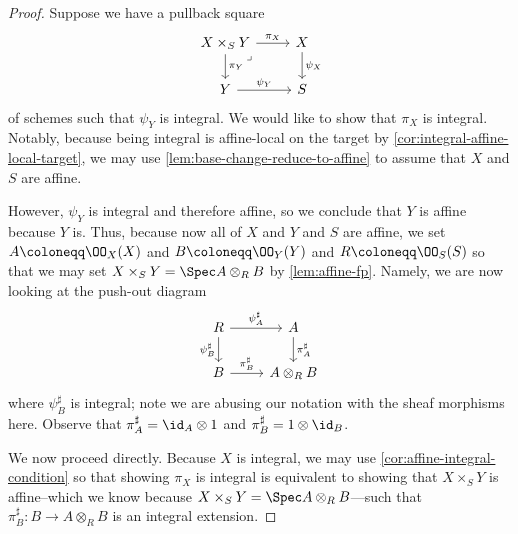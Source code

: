 \documentclass[../notes.tex]{subfiles}
\begin{document}
\begin{proof}
	Suppose we have a pullback square
	\[\begin{tikzcd}
		{X\times_SY} & X \\
		Y & S
		\arrow["{\psi_Y}", from=2-1, to=2-2]
		\arrow["{\pi_X}", from=1-1, to=1-2]
		\arrow["{\pi_Y}", from=1-1, to=2-1]
		\arrow["{\psi_X}", from=1-2, to=2-2]
		\arrow["\lrcorner"{anchor=center, pos=0.125}, draw=none, from=1-1, to=2-2]
	\end{tikzcd}\]
	of schemes such that $\psi_Y$ is integral. We would like to show that $\pi_X$ is integral. Notably, because being integral is affine-local on the target by \autoref{cor:integral-affine-local-target}, we may use \autoref{lem:base-change-reduce-to-affine} to assume that $X$ and $S$ are affine.

	However, $\psi_Y$ is integral and therefore affine, so we conclude that $Y$ is affine because $Y$ is. Thus, because now all of $X$ and $Y$ and $S$ are affine, we set $A\coloneqq\OO_X(X)$ and $B\coloneqq\OO_Y(Y)$ and $R\coloneqq\OO_S(S)$ so that we may set $X\times_SY=\Spec A\otimes_RB$ by \autoref{lem:affine-fp}. Namely, we are now looking at the push-out diagram
	\[\begin{tikzcd}
		R & A \\
		B & {A\otimes_RB}
		\arrow["{\psi^\sharp_A}", from=1-1, to=1-2]
		\arrow["{\pi^\sharp_A}", from=1-2, to=2-2]
		\arrow["{\psi^\sharp_B}"', from=1-1, to=2-1]
		\arrow["{\pi^\sharp_B}", from=2-1, to=2-2]
	\end{tikzcd}\]
	where $\psi^\sharp_B$ is integral; note we are abusing our notation with the sheaf morphisms here. Observe that $\pi^\sharp_A={\id_A}\otimes1$ and $\pi^\sharp_B=1\otimes{\id_B}$.

	We now proceed directly. Because $X$ is integral, we may use \autoref{cor:affine-integral-condition} so that showing $\pi_X$ is integral is equivalent to showing that $X\times_SY$ is affine--which we know because $X\times_SY=\Spec A\otimes_RB$---such that $\pi^\sharp_B\colon B\to A\otimes_RB$ is an integral extension.
	

\end{proof}
\end{document}
